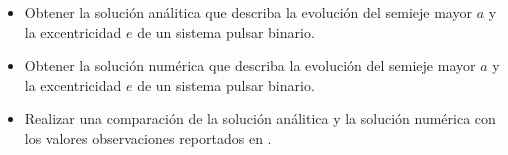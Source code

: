 \begin{itemize}
    \item Obtener la solución análitica que describa la evolución del semieje mayor $a$ y la excentricidad $e$ de un sistema pulsar binario.
    \item Obtener la solución numérica que describa la evolución del semieje mayor $a$ y la excentricidad $e$ de un sistema pulsar binario.
    \item Realizar una comparación de la solución análitica y la solución numérica con los valores observaciones reportados en \cite{Weisberg2010}.
\end{itemize}